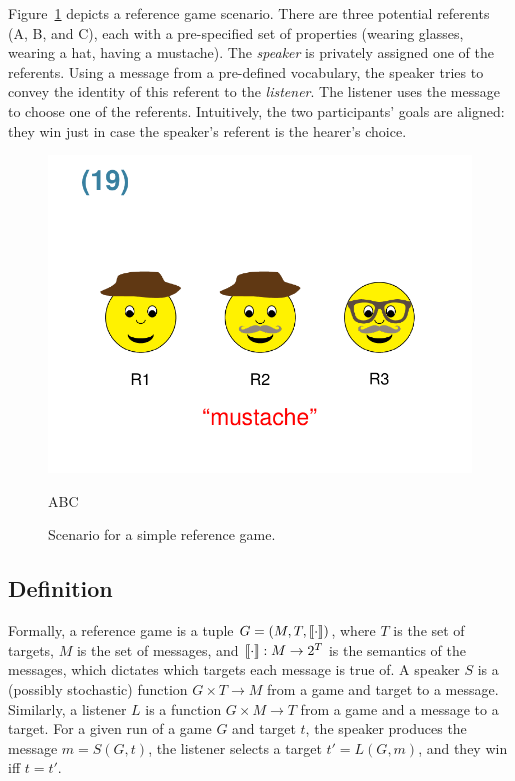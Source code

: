 Figure~\ref{fig:scalesStimulus} depicts a reference game
scenario. There are three potential referents (A, B, and C), each with
a pre-specified set of properties (wearing glasses, wearing a hat,
having a mustache). The \emph{speaker} is privately assigned one of
the referents. Using a message from a pre-defined vocabulary, the
speaker tries to convey the identity of this referent to the
\emph{listener}. The listener uses the message to choose one of the
referents. Intuitively, the two participants' goals are aligned: they
win just in case the speaker's referent is the hearer's choice.

\begin{figure}[ht]
  \centering
  \includegraphics[width=0.7\columnwidth]{fig/refgame-sample}

  \vspace{-4pt}
  
  A\hspace{55pt}B\hspace{55pt}C
  \caption{Scenario for a simple reference game.}
  \label{fig:scalesStimulus}
\end{figure}

\subsection{Definition}
Formally, a reference game is a tuple $G = (M,T,\llbracket\cdot\rrbracket)$, where
$T$ is the set of targets, $M$ is the set of messages, and
$\llbracket\cdot\rrbracket : M \to 2^{T}$ is the semantics of the messages, which
dictates which targets each message is true of.  A speaker $S$ is a
(possibly stochastic) function $G \times T \to M$ from a game and
target to a message. Similarly, a listener $L$ is a function $G \times
M \to T$ from a game and a message to a target.  For a given run of a
game $G$ and target $t$, the speaker produces the message $m =
S(G,t)$, the listener selects a target $t' = L(G,m)$, and they win iff
$t = t'$.

